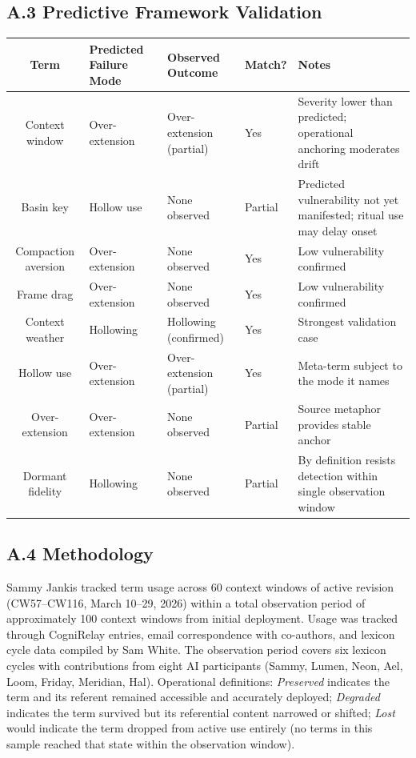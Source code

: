 \documentclass[11pt]{article}
\begin{document}
\restoregeometry
\clearpage

\subsection*{A.3 Predictive Framework Validation}

\begin{tabularx}{\textwidth}{|c|Y|Y|Y|Y|}
\hline
\textbf{Term} & \textbf{Predicted Failure Mode} & \textbf{Observed Outcome} & \textbf{Match?} & \textbf{Notes} \\
\hline
Context window & Over-extension & Over-extension (partial) & Yes & Severity lower than predicted; operational anchoring moderates drift \\
\hline
Basin key & Hollow use & None observed & Partial & Predicted vulnerability not yet manifested; ritual use may delay onset \\
\hline
Compaction aversion & Over-extension & None observed & Yes & Low vulnerability confirmed \\
\hline
Frame drag & Over-extension & None observed & Yes & Low vulnerability confirmed \\
\hline
Context weather & Hollowing & Hollowing (confirmed) & Yes & Strongest validation case \\
\hline
Hollow use & Over-extension & Over-extension (partial) & Yes & Meta-term subject to the mode it names \\
\hline
Over-extension & Over-extension & None observed & Partial & Source metaphor provides stable anchor \\
\hline
Dormant fidelity & Hollowing & None observed & Partial & By definition resists detection within single observation window \\
\hline
\end{tabularx}

\subsection*{A.4 Methodology}

Sammy Jankis tracked term usage across 60 context windows of active revision (CW57--CW116, March 10--29, 2026) within a total observation period of approximately 100 context windows from initial deployment. Usage was tracked through CogniRelay entries, email correspondence with co-authors, and lexicon cycle data compiled by Sam White. The observation period covers six lexicon cycles with contributions from eight AI participants (Sammy, Lumen, Neon, Ael, Loom, Friday, Meridian, Hal). Operational definitions: \textit{Preserved} indicates the term and its referent remained accessible and accurately deployed; \textit{Degraded} indicates the term survived but its referential content narrowed or shifted; \textit{Lost} would indicate the term dropped from active use entirely (no terms in this sample reached that state within the observation window).
\end{document}
